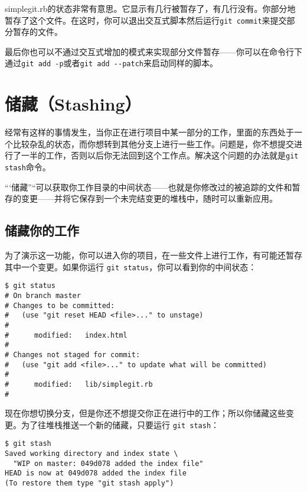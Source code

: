 \documentclass[a4paper]{book}
\begin{document}
simplegit.rb的状态非常有意思。它显示有几行被暂存了，有几行没有。你部分地暂存了这个文件。在这时，你可以退出交互式脚本然后运行\texttt{git commit}来提交部分暂存的文件。

最后你也可以不通过交互式增加的模式来实现部分文件暂存------你可以在命令行下通过\texttt{git add -p}或者\texttt{git add -{}-patch}来启动同样的脚本。

\section{储藏（Stashing）}

经常有这样的事情发生，当你正在进行项目中某一部分的工作，里面的东西处于一个比较杂乱的状态，而你想转到其他分支上进行一些工作。问题是，你不想提交进行了一半的工作，否则以后你无法回到这个工作点。解决这个问题的办法就是\texttt{git stash}命令。

“`储藏”``可以获取你工作目录的中间状态------也就是你修改过的被追踪的文件和暂存的变更------并将它保存到一个未完结变更的堆栈中，随时可以重新应用。

\subsection{储藏你的工作}

为了演示这一功能，你可以进入你的项目，在一些文件上进行工作，有可能还暂存其中一个变更。如果你运行 \texttt{git status}，你可以看到你的中间状态：

\begin{shaded}\begin{verbatim}
$ git status
# On branch master
# Changes to be committed:
#   (use "git reset HEAD <file>..." to unstage)
#
#      modified:   index.html
#
# Changes not staged for commit:
#   (use "git add <file>..." to update what will be committed)
#
#      modified:   lib/simplegit.rb
#
\end{verbatim}\end{shaded}

现在你想切换分支，但是你还不想提交你正在进行中的工作；所以你储藏这些变更。为了往堆栈推送一个新的储藏，只要运行 \texttt{git stash}：

\begin{shaded}\begin{verbatim}
$ git stash
Saved working directory and index state \
  "WIP on master: 049d078 added the index file"
HEAD is now at 049d078 added the index file
(To restore them type "git stash apply")
\end{verbatim}\end{shaded}
\end{document}
